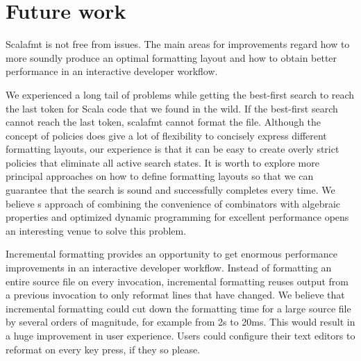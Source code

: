 \section{Future work}
Scalafmt is not free from issues.
The main areas for improvements regard how to more soundly produce an optimal formatting layout and how to obtain better performance in an interactive developer workflow.

We experienced a long tail of problems while getting the best-first search to reach the last token for Scala code that we found in the wild.
If the best-first search cannot reach the last token, scalafmt cannot format the file.
Although the concept of policies does give a lot of flexibility to concisely express different formatting layouts, our experience is that it can be easy to create overly strict policies that eliminate all active search states.
It is worth to explore more principal approaches on how to define formatting layouts so that we can guarantee that the search is sound and successfully completes every time.
We believe \rfmt{}s approach of combining the convenience of combinators with algebraic properties and optimized dynamic programming for excellent performance opens an interesting venue to solve this problem.

Incremental formatting provides an opportunity to get enormous performance improvements in an interactive developer workflow.
Instead of formatting an entire source file on every invocation, incremental formatting reuses output from a previous invocation to only reformat lines that have changed.
We believe that incremental formatting could cut down the formatting time for a large source file by several orders of magnitude, for example from 2s to 20ms.
This would result in a huge improvement in user experience.
Users could configure their text editors to reformat on every key press, if they so please.

